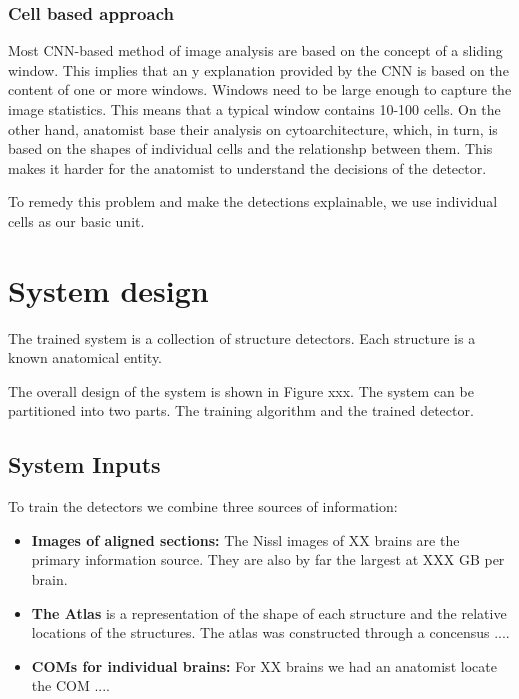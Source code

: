 \documentclass[runningheads]{llncs}
\begin{document}
\begin{enumerate}
\subsubsection{Cell based approach}  Most CNN-based method of image
analysis are based on the concept of a sliding window. This implies
that an
y explanation provided by the CNN is based on the content of one or more windows. Windows need to be large enough to capture the image statistics. This means that a typical window contains 10-100 cells.
On the other hand, anatomist base their analysis on cytoarchitecture, which, in turn, is based on the shapes of individual cells and the relationshp between them. This makes it harder for the anatomist to understand the decisions of the detector.

To remedy this problem and make the detections explainable, we use individual cells as our basic unit. 
\end{enumerate}

\section{System design}

The trained system is a collection of structure detectors. Each structure is a known anatomical entity. 

The overall design of the system is shown in Figure xxx. The system can be partitioned into two parts. The training algorithm and the trained detector.

\subsection{System Inputs}
To train the detectors we combine three sources of information:
\begin{itemize}
    \item {\bf Images of aligned sections:} The Nissl images of XX brains are the primary information source. They are also by far the largest at XXX GB per brain.
    \item {\bf The Atlas} is a representation of the shape of each structure and the relative locations of the structures. The atlas was constructed through a concensus ....
    \item {\bf COMs for individual brains:} For XX brains we had an anatomist locate the COM ....
\end{itemize}
\end{document}
